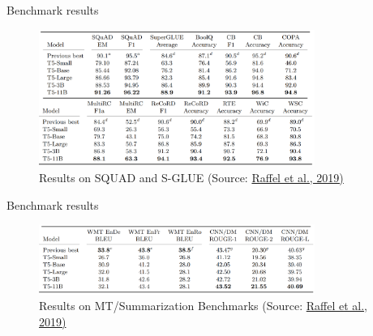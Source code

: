 
\begin{frame}{Benchmark results}

\vfill

	\begin{figure}
		\centering
		\includegraphics[width = 9cm]{figure/63-t5-squad-sglue.png}\\ 
		\footnotesize{Results on SQUAD and S-GLUE (Source:} \href{https://arxiv.org/pdf/1910.10683.pdf}{\footnotesize Raffel et al., 2019)}
	\end{figure}
	
\vfill

\end{frame}


\begin{frame}{Benchmark results}

\vfill

	\begin{figure}
		\centering
		\includegraphics[width = 9cm]{figure/63-t5-mt.png}\\ 
		\footnotesize{Results on MT/Summarization Benchmarks (Source:} \href{https://arxiv.org/pdf/1910.10683.pdf}{\footnotesize Raffel et al., 2019)}
	\end{figure}
	
\vfill

\end{frame}


